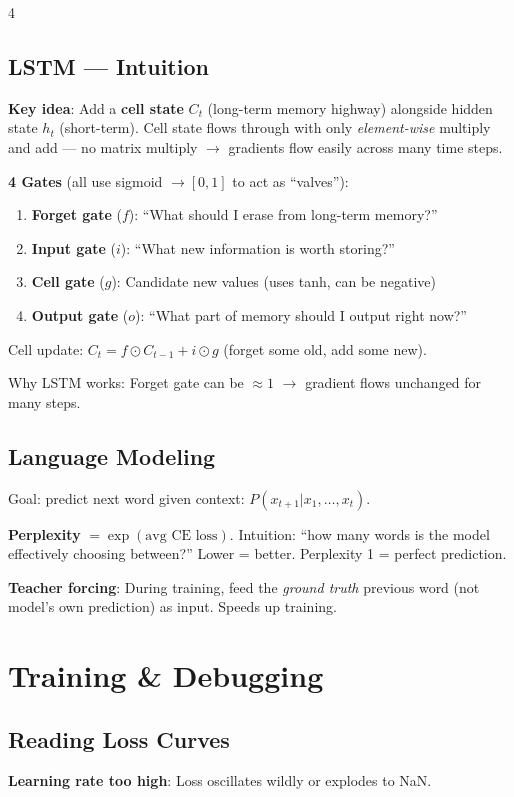 \documentclass[6pt,landscape,a4paper]{extarticle}
\begin{document}
\begin{multicols}{4}
\subsection{LSTM --- Intuition}
\textbf{Key idea}: Add a \textbf{cell state} $C_t$ (long-term memory highway) alongside hidden state $h_t$ (short-term). Cell state flows through with only \textit{element-wise} multiply and add --- no matrix multiply $\to$ gradients flow easily across many time steps.

\textbf{4 Gates} (all use sigmoid $\to [0,1]$ to act as ``valves''):
\begin{enumerate}[nosep,leftmargin=*]
\item \textbf{Forget gate} ($f$): ``What should I erase from long-term memory?''
\item \textbf{Input gate} ($i$): ``What new information is worth storing?''
\item \textbf{Cell gate} ($g$): Candidate new values (uses tanh, can be negative)
\item \textbf{Output gate} ($o$): ``What part of memory should I output right now?''
\end{enumerate}

Cell update: $C_t = f \odot C_{t-1} + i \odot g$ (forget some old, add some new).

Why LSTM works: Forget gate can be $\approx 1$ $\to$ gradient flows unchanged for many steps.

\subsection{Language Modeling}
Goal: predict next word given context: $P(x_{t+1}|x_1,\ldots,x_t)$.

\textbf{Perplexity} $= \exp(\text{avg CE loss})$. Intuition: ``how many words is the model effectively choosing between?'' Lower = better. Perplexity 1 = perfect prediction.

\textbf{Teacher forcing}: During training, feed the \textit{ground truth} previous word (not model's own prediction) as input. Speeds up training.

\section{Training \& Debugging}

\subsection{Reading Loss Curves}
\textbf{Learning rate too high}: Loss oscillates wildly or explodes to NaN.


\end{multicols}
\end{document}
